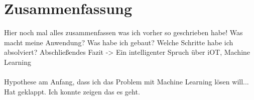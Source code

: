 \chapter{Zusammenfassung}
\label{ch:zusammenfassung}
Hier noch mal alles zusammenfassen was ich vorher so geschrieben habe! Was macht meine Anwendung? Was habe ich gebaut?
Welche Schritte habe ich absolviert? Abschließendes Fazit -> Ein intelligenter Spruch über iOT, Machine Learning
\\ \\
Hypothese am Anfang, dass ich das Problem mit Machine Learning lösen will... Hat geklappt. Ich konnte zeigen das es geht.